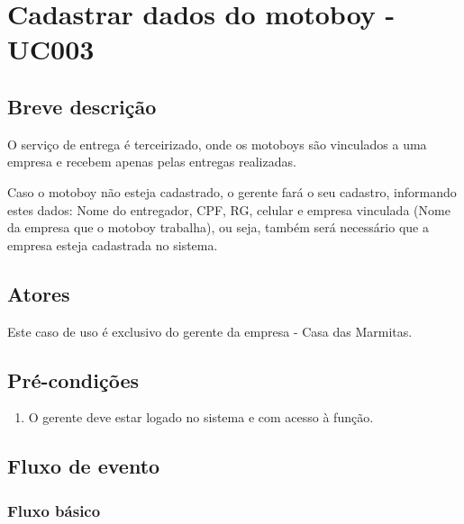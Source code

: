 \chapter{Cadastrar dados do motoboy - UC003} \label{uc003}

\section{Breve descrição}

O serviço de entrega é terceirizado, onde os motoboys são vinculados a uma empresa e recebem apenas pelas entregas realizadas.

Caso o motoboy não esteja cadastrado, o gerente fará o seu cadastro, informando estes dados: Nome do entregador, CPF, RG, celular e empresa vinculada (Nome da empresa que o motoboy trabalha), ou seja, também será necessário que a empresa esteja cadastrada no sistema.

\section{Atores}

Este caso de uso é exclusivo do gerente da empresa - Casa das Marmitas.

\section{Pré-condições}

\begin{enumerate}
	\item O gerente deve estar logado no sistema e com acesso à função.
\end{enumerate}

\section{Fluxo de evento}

\subsection{Fluxo básico}

